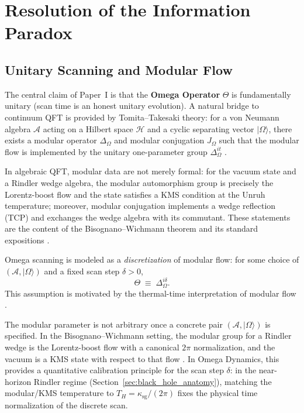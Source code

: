 \section{Resolution of the Information Paradox}
\label{sec:information_paradox}

\subsection{Unitary Scanning and Modular Flow}
The central claim of Paper~I \cite{Ma2025HPA} is that the \textbf{Omega Operator} $\Theta$ is fundamentally unitary (scan time is an honest unitary evolution). A natural bridge to continuum QFT is provided by Tomita--Takesaki theory: for a von Neumann algebra $\mathcal{A}$ acting on a Hilbert space $\mathcal{H}$ and a cyclic separating vector $|\Omega\rangle$, there exists a modular operator $\Delta_\Omega$ and modular conjugation $J_\Omega$ such that the modular flow is implemented by the unitary one-parameter group $\Delta_\Omega^{it}$ \cite{Takesaki2002, Borchers2000, Witten2018}.
\par
In algebraic QFT, modular data are not merely formal: for the vacuum state and a Rindler wedge algebra, the modular automorphism group is precisely the Lorentz-boost flow and the state satisfies a KMS condition at the Unruh temperature; moreover, modular conjugation implements a wedge reflection (TCP) and exchanges the wedge algebra with its commutant. These statements are the content of the Bisognano--Wichmann theorem and its standard expositions \cite{BisognanoWichmann1975, BisognanoWichmann1976, Haag1996}.

\begin{assumption}
\label{assump:modular_scan}
Omega scanning is modeled as a \emph{discretization} of modular flow: for some choice of $(\mathcal{A},|\Omega\rangle)$ and a fixed scan step $\delta>0$,
\begin{equation}
  \Theta \;\equiv\; \Delta_\Omega^{i\delta}.
\end{equation}
This assumption is motivated by the thermal-time interpretation of modular flow \cite{ConnesRovelli1994}.
\end{assumption}

\begin{remark}
The modular parameter is not arbitrary once a concrete pair $(\mathcal{A},|\Omega\rangle)$ is specified. In the Bisognano--Wichmann setting, the modular group for a Rindler wedge is the Lorentz-boost flow with a canonical $2\pi$ normalization, and the vacuum is a KMS state with respect to that flow \cite{BisognanoWichmann1975,BisognanoWichmann1976,Haag1996}. In Omega Dynamics, this provides a quantitative calibration principle for the scan step $\delta$: in the near-horizon Rindler regime (Section~\ref{sec:black_hole_anatomy}), matching the modular/KMS temperature to $T_H=\kappa_{\mathrm{sg}}/(2\pi)$ fixes the physical time normalization of the discrete scan.
\end{remark}

